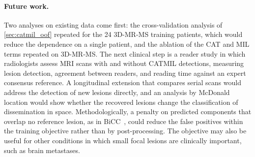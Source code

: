 \paragraph{Future work.}
Two analyses on existing data come first: the cross-validation analysis
of \cref{sec:catmil_oof} repeated for the 24 3D-MR-MS training patients,
which would reduce the dependence on a single patient, and the ablation of the CAT and MIL
terms repeated on 3D-MR-MS. The next clinical step is a reader study in
which radiologists assess MRI scans with and without CATMIL detections,
measuring lesion detection, agreement between readers, and reading time
against an expert consensus reference.
A longitudinal extension that compares serial scans would address the
detection of new lesions directly, and an analysis by McDonald location
would show whether the recovered lesions change the classification of
dissemination in space. Methodologically, a penalty on predicted
components that overlap no reference lesion, as in
BiCC~\cite{bouteille_bicc_2026}, could reduce the false positives within
the training objective rather than by post-processing. The objective may
also be useful for other conditions in which small focal lesions are
clinically important, such as brain metastases.
